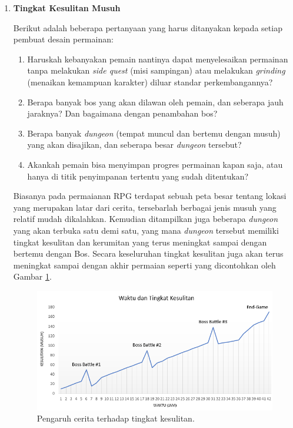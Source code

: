 \begin{enumerate}[label=\textbf{\arabic*).}]
	\item \textbf{Tingkat Kesulitan Musuh}
	\setlength{\parindent}{0.8cm}

	Berikut adalah beberapa pertanyaan yang harus ditanyakan kepada setiap pembuat desain permainan:
	
	\begin{enumerate}[label=\alph*).]
		\item Haruskah kebanyakan pemain nantinya dapat menyelesaikan permainan tanpa melakukan \textit{side quest} (misi sampingan) atau melakukan \textit{grinding} (menaikan kemampuan karakter) diluar standar perkembangannya?
		\item Berapa banyak bos yang akan dilawan oleh pemain, dan seberapa jauh jaraknya? Dan bagaimana dengan penambahan bos?
		\item Berapa banyak \textit{dungeon} (tempat muncul dan bertemu dengan musuh) yang akan disajikan, dan seberapa besar \textit{dungeon} tersebut?
		\item Akankah pemain bisa menyimpan progres permainan kapan saja, atau hanya di titik penyimpanan tertentu yang sudah ditentukan?
	\end{enumerate}

	Biasanya pada permaianan RPG terdapat sebuah peta besar tentang lokasi yang merupakan latar dari cerita, tersebarlah berbagai jenis musuh yang relatif mudah dikalahkan. Kemudian ditampilkan juga beberapa \textit{dungeon} yang akan terbuka satu demi satu, yang mana \textit{dungeon} tersebut memiliki tingkat kesulitan dan kerumitan yang terus meningkat sampai dengan bertemu dengan Bos. Secara keseluruhan tingkat kesulitan juga akan terus meningkat sampai dengan akhir permaian seperti yang dicontohkan oleh Gambar \ref{fig:story_dungeon}.
	\vspace{1ex}
	
	\begin{figure} [!h] \centering
		\includegraphics[scale=0.7]{img/story_dungeon.png}
		\caption{Pengaruh cerita terhadap tingkat kesulitan.}
		\label{fig:story_dungeon}
	\end{figure}
	

\end{enumerate}
